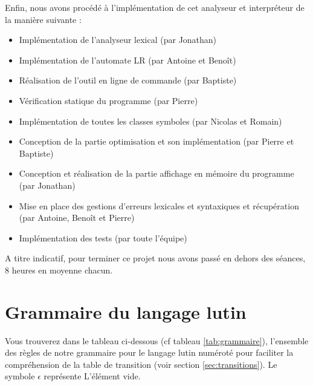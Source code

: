 Enfin, nous avons procédé à l'implémentation de cet analyseur et interpréteur de la manière suivante :
\begin{itemize}
	\item Implémentation de l'analyseur lexical (par Jonathan)
	\item Implémentation de l'automate LR (par Antoine et Benoît)
	\item Réalisation de l'outil en ligne de commande (par Baptiste)
	\item Vérification statique du programme (par Pierre)
	\item Implémentation de toutes les classes symboles (par Nicolas et Romain)
	\item Conception de la partie optimisation et son implémentation (par Pierre et Baptiste)
	\item Conception et réalisation de la partie affichage en mémoire du programme (par Jonathan)
	\item Mise en place des gestions d'erreurs lexicales et syntaxiques et récupération (par Antoine, Benoît et Pierre)
	\item Implémentation des tests (par toute l'équipe)\\
\end{itemize}

A titre indicatif, pour terminer ce projet nous avons passé en dehors des séances, 8 heures en moyenne chacun.

\newpage

\section{Grammaire du langage lutin}
\label{sec:grammaire}

Vous trouverez dans le tableau ci-dessous (cf tableau \ref{tab:grammaire}), l'ensemble des règles de notre grammaire pour le langage lutin numéroté pour faciliter la compréhension de la table de transition (voir section \ref{sec:transitions}). Le symbole $\epsilon$ représente L’élément vide.

